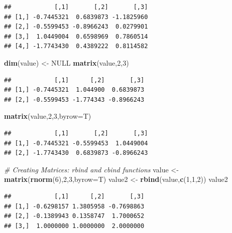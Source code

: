 \documentclass[
]{book}
\newenvironment{Shaded}{\begin{snugshade}}{\end{snugshade}}
\newcommand{\CommentTok}[1]{\textcolor[rgb]{0.56,0.35,0.01}{\textit{#1}}}
\newcommand{\DataTypeTok}[1]{\textcolor[rgb]{0.13,0.29,0.53}{#1}}
\newcommand{\DecValTok}[1]{\textcolor[rgb]{0.00,0.00,0.81}{#1}}
\newcommand{\KeywordTok}[1]{\textcolor[rgb]{0.13,0.29,0.53}{\textbf{#1}}}
\newcommand{\NormalTok}[1]{#1}
\newcommand{\OtherTok}[1]{\textcolor[rgb]{0.56,0.35,0.01}{#1}}
\newcommand{\StringTok}[1]{\textcolor[rgb]{0.31,0.60,0.02}{#1}}
\begin{document}
\begin{verbatim}
##            [,1]       [,2]       [,3]
## [1,] -0.7445321  0.6839873 -1.1825960
## [2,] -0.5599453 -0.8966243  0.0279901
## [3,]  1.0449004  0.6598969  0.7860514
## [4,] -1.7743430  0.4389222  0.8114582
\end{verbatim}

\begin{Shaded}
\begin{Highlighting}[]
\KeywordTok{dim}\NormalTok{(value) <-}\StringTok{ }\OtherTok{NULL}
\KeywordTok{matrix}\NormalTok{(value,}\DecValTok{2}\NormalTok{,}\DecValTok{3}\NormalTok{)}
\end{Highlighting}
\end{Shaded}

\begin{verbatim}
##            [,1]      [,2]       [,3]
## [1,] -0.7445321  1.044900  0.6839873
## [2,] -0.5599453 -1.774343 -0.8966243
\end{verbatim}

\begin{Shaded}
\begin{Highlighting}[]
\KeywordTok{matrix}\NormalTok{(value,}\DecValTok{2}\NormalTok{,}\DecValTok{3}\NormalTok{,}\DataTypeTok{byrow=}\NormalTok{T)}
\end{Highlighting}
\end{Shaded}

\begin{verbatim}
##            [,1]       [,2]       [,3]
## [1,] -0.7445321 -0.5599453  1.0449004
## [2,] -1.7743430  0.6839873 -0.8966243
\end{verbatim}

\begin{Shaded}
\begin{Highlighting}[]
\CommentTok{# Creating Matrices: rbind and cbind functions}
\NormalTok{value <-}\StringTok{ }\KeywordTok{matrix}\NormalTok{(}\KeywordTok{rnorm}\NormalTok{(}\DecValTok{6}\NormalTok{),}\DecValTok{2}\NormalTok{,}\DecValTok{3}\NormalTok{,}\DataTypeTok{byrow=}\NormalTok{T)}
\NormalTok{value2 <-}\StringTok{ }\KeywordTok{rbind}\NormalTok{(value,}\KeywordTok{c}\NormalTok{(}\DecValTok{1}\NormalTok{,}\DecValTok{1}\NormalTok{,}\DecValTok{2}\NormalTok{))}
\NormalTok{value2}
\end{Highlighting}
\end{Shaded}

\begin{verbatim}
##            [,1]      [,2]       [,3]
## [1,] -0.6298157 1.3805958 -0.7698863
## [2,] -0.1389943 0.1358747  1.7000652
## [3,]  1.0000000 1.0000000  2.0000000
\end{verbatim}
\end{document}
